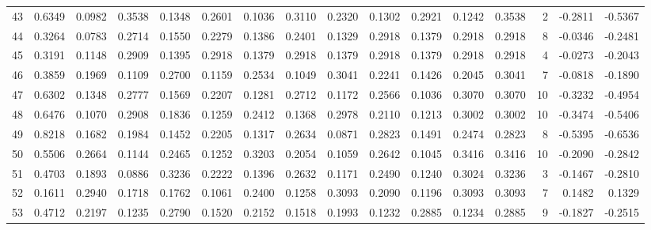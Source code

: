 \begin{tabular}{lrrrrrrrrrrrrrrr}
43  &      0.6349 &  0.0982 &  0.3538 &  0.1348 &  0.2601 &  0.1036 &  0.3110 &  0.2320 &  0.1302 &  0.2921 &   0.1242 &     0.3538 &      2 &                   -0.2811 &                    -0.5367 \\
44  &      0.3264 &  0.0783 &  0.2714 &  0.1550 &  0.2279 &  0.1386 &  0.2401 &  0.1329 &  0.2918 &  0.1379 &   0.2918 &     0.2918 &      8 &                   -0.0346 &                    -0.2481 \\
45  &      0.3191 &  0.1148 &  0.2909 &  0.1395 &  0.2918 &  0.1379 &  0.2918 &  0.1379 &  0.2918 &  0.1379 &   0.2918 &     0.2918 &      4 &                   -0.0273 &                    -0.2043 \\
46  &      0.3859 &  0.1969 &  0.1109 &  0.2700 &  0.1159 &  0.2534 &  0.1049 &  0.3041 &  0.2241 &  0.1426 &   0.2045 &     0.3041 &      7 &                   -0.0818 &                    -0.1890 \\
47  &      0.6302 &  0.1348 &  0.2777 &  0.1569 &  0.2207 &  0.1281 &  0.2712 &  0.1172 &  0.2566 &  0.1036 &   0.3070 &     0.3070 &     10 &                   -0.3232 &                    -0.4954 \\
48  &      0.6476 &  0.1070 &  0.2908 &  0.1836 &  0.1259 &  0.2412 &  0.1368 &  0.2978 &  0.2110 &  0.1213 &   0.3002 &     0.3002 &     10 &                   -0.3474 &                    -0.5406 \\
49  &      0.8218 &  0.1682 &  0.1984 &  0.1452 &  0.2205 &  0.1317 &  0.2634 &  0.0871 &  0.2823 &  0.1491 &   0.2474 &     0.2823 &      8 &                   -0.5395 &                    -0.6536 \\
50  &      0.5506 &  0.2664 &  0.1144 &  0.2465 &  0.1252 &  0.3203 &  0.2054 &  0.1059 &  0.2642 &  0.1045 &   0.3416 &     0.3416 &     10 &                   -0.2090 &                    -0.2842 \\
51  &      0.4703 &  0.1893 &  0.0886 &  0.3236 &  0.2222 &  0.1396 &  0.2632 &  0.1171 &  0.2490 &  0.1240 &   0.3024 &     0.3236 &      3 &                   -0.1467 &                    -0.2810 \\
52  &      0.1611 &  0.2940 &  0.1718 &  0.1762 &  0.1061 &  0.2400 &  0.1258 &  0.3093 &  0.2090 &  0.1196 &   0.3093 &     0.3093 &      7 &                    0.1482 &                     0.1329 \\
53  &      0.4712 &  0.2197 &  0.1235 &  0.2790 &  0.1520 &  0.2152 &  0.1518 &  0.1993 &  0.1232 &  0.2885 &   0.1234 &     0.2885 &      9 &                   -0.1827 &                    -0.2515 \\

\end{tabular}
